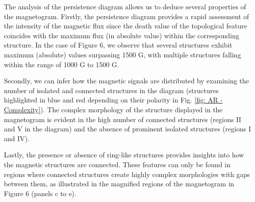 \documentclass[12pt]{mythesis}
\begin{document}
The analysis of the persistence diagram allows us to deduce several properties of the magnetogram. Firstly, the persistence diagram provides a rapid assessment of the intensity of the magnetic flux since the death value of the topological feature coincides with the maximum flux (in absolute value) within the corresponding structure. In the case of Figure 6, we observe that several structures exhibit maximum (absolute) values surpassing 1500 G, with multiple structures falling within the range of 1000 G to 1500 G.

Secondly, we can infer how the magnetic signals are distributed by examining the number of isolated and connected structures in the diagram (structures highlighted in blue and red depending on their polarity in Fig. \ref{fig:  AR - Complexity}). The complex morphology of the structure displayed in the magnetogram is evident in the high number of connected structures (regions II and V in the diagram) and the absence of prominent isolated structures (regions I and IV).

Lastly, the presence or absence of ring-like structures provides insights into how the magnetic structures are connected. These features can only be found in regions where connected structures create highly complex morphologies with gaps between them, as illustrated in the magnified regions of the magnetogram in Figure 6 (panels c to e).
\end{document}
